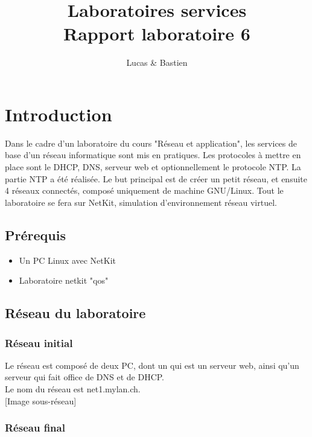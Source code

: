 \documentclass{article}
\title{%
	Laboratoires services \\
	\large Rapport laboratoire 6
}
\author{\bsc{Bulloni} Lucas \& \bsc{Wermeille} Bastien}
\begin{document}
\maketitle

\newpage

\tableofcontents

\newpage

\section{Introduction}
	
Dans le cadre d'un laboratoire du cours "Réseau et application", les services de base d'un réseau informatique sont mis en pratiques. Les protocoles à mettre en place sont le DHCP, DNS, serveur web et optionnellement le protocole NTP. La partie NTP a été réalisée. Le but principal est de créer un petit réseau, et ensuite 4 réseaux connectés, composé uniquement de machine GNU/Linux. Tout le laboratoire se fera sur NetKit, simulation d'environnement réseau virtuel.

\subsection{Prérequis}

\begin{itemize}
	\item Un PC Linux avec NetKit
	\item Laboratoire netkit "qos"
\end{itemize}

\subsection{Réseau du laboratoire}

\subsubsection{Réseau initial}

Le réseau est composé de deux PC, dont un qui est un serveur web, ainsi qu'un serveur qui fait office de DNS et de DHCP.\\

Le nom du réseau est net1.mylan.ch.\\

[Image sous-réseau]

\subsubsection{Réseau final}
\end{document}

